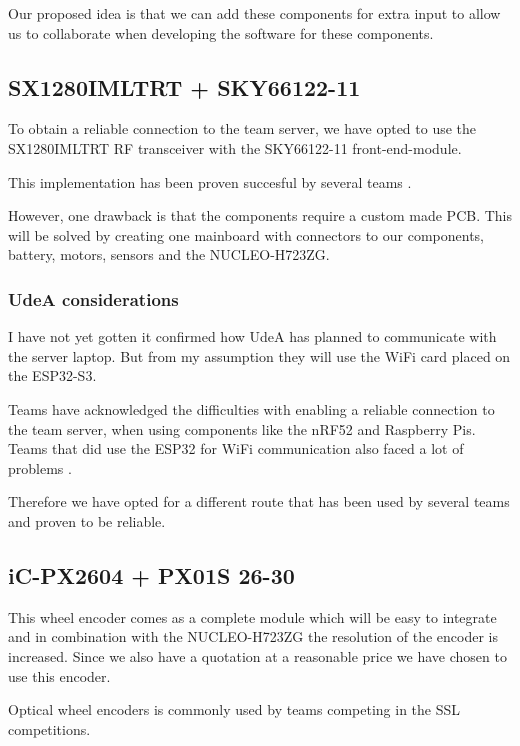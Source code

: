 \documentclass[a4paper,8pt]{article}
\begin{document}
  Our proposed idea is that we can add these components for extra input to allow us to collaborate when developing the software for these components. 

  \subsection{SX1280IMLTRT + SKY66122-11}

  To obtain a reliable connection to the team server, we have opted to
  use the SX1280IMLTRT RF transceiver with the SKY66122-11
  front-end-module.

  This implementation has been proven succesful by several teams \cite{ryllExtendedTeamDescription}\cite{barretoRoboIMEIgnitingInnovation}.

  However, one drawback is that the components require a custom made
  PCB. This will be solved by creating one mainboard with connectors to
  our components, battery, motors, sensors and the NUCLEO-H723ZG. 

  \subsubsection{UdeA considerations}

  I have not yet gotten it confirmed how UdeA has planned to communicate with the server laptop. But from my assumption they will use the WiFi card placed on the ESP32-S3. 

  Teams have acknowledged the difficulties with enabling a reliable connection to the team server, when using components like the nRF52 and Raspberry Pis. Teams that did use the ESP32 for WiFi communication also faced a lot of problems \cite{bhatKgpKubs2020Team}.

  Therefore we have opted for a different route that has been used by several teams and proven to be reliable\cite{ryllExtendedTeamDescription}.

  \subsection{iC-PX2604 + PX01S 26-30}

  This wheel encoder comes as a complete module which will be easy to
  integrate and in combination with the NUCLEO-H723ZG the resolution of
  the encoder is increased. Since we also have a quotation at a
  reasonable price we have chosen to use this encoder.

  Optical wheel encoders is commonly used by teams competing in the SSL competitions.
\end{document}
